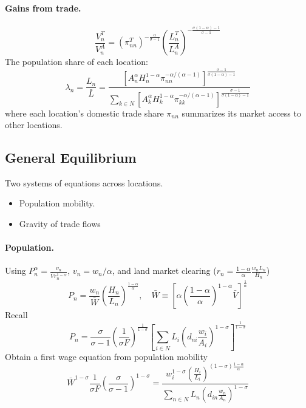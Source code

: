 \documentclass[11pt,a4paper]{article}
\begin{document}
\paragraph{Gains from trade.}
$$ \frac{V_n^T}{V_n^A} = \left(\pi_{nn}^T \right)^{- \frac{\alpha }{\sigma -1}} \left( \frac{L_n^T}{L_n^A} \right)^{- \frac{\sigma (1-\alpha )-1}{\sigma -1}} $$
The population share of each location: 
\begin{equation}
  \lambda _n = \frac{L_n}{\bar{L}} = \frac{\left[ A_n^\alpha H_n^{1-\alpha } \pi _{nn}^{-\alpha /(\alpha -1)} \right]^{\frac{\sigma -1}{\sigma (1-\alpha )-1}}}{\sum_{k \in N}^{}\left[ A_k^\alpha H_k^{1-\alpha } \pi _{kk}^{-\alpha /(\alpha -1)} \right]^{\frac{\sigma -1}{\sigma (1-\alpha )-1}}}
\end{equation}
where each location's domestic trade share $\pi _{nn}$ summarizes its market access to other locations.  




\subsection{General Equilibrium}
Two systems of equations across locations. \begin{itemize}
  \item Population mobility.  
  \item Gravity of trade flows
\end{itemize}
\paragraph{Population.}
Using $P_n^\alpha  = \frac{v_n}{\bar{V} r_n^{1-\alpha }}$, $v_n = w_n/\alpha $, and land market clearing ($r_n = \frac{1-\alpha }{\alpha } \frac{w_n L_n}{H_n}$)
\begin{equation}
  P_n = \frac{w_n}{\bar{W}} \left( \frac{H_n}{L_n} \right)^{\frac{1-\alpha }{\alpha }}, \quad \bar{W} \equiv \left[ \alpha \left( \frac{1-\alpha }{\alpha } \right)^{1-\alpha } \bar{V} \right]^{\frac{1}{\alpha }}
\end{equation}
Recall $$ P_n = \frac{\sigma }{\sigma -1} \left( \frac{1}{\sigma F} \right)^{\frac{1}{1-\sigma }} \left[ \sum_{i \in N}^{} L_i \left( d_{ni}  \frac{w_i}{A_i}\right)^{1-\sigma } \right]^{\frac{1}{1-\sigma }} $$
Obtain a first wage equation from population mobility 
\begin{equation}
  \bar{W}^{1-\sigma } \frac{1}{\sigma F} \left( \frac{\sigma }{\sigma -1} \right)^{1-\sigma } = \frac{w_i^{1-\sigma } \left( \frac{H_i}{L_i} \right)^{(1-\sigma ) \frac{1-\alpha }{\alpha }}}{\sum_{n \in N}^{} L_n \left( d_{in} \frac{w_n}{A_n} \right)^{1-\sigma }}\label{eq:sys1}
\end{equation}
\end{document}
